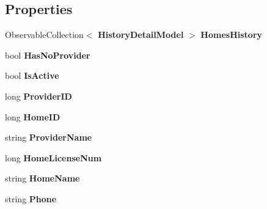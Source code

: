 \subsection*{Properties}
\begin{DoxyCompactItemize}
\item 
\mbox{\label{class_a_f_h___scheduler_1_1_data_1_1_schedule_model_a9bd568e7c4086ee32418044a2c4a8385}} 
Observable\+Collection$<$ \textbf{ History\+Detail\+Model} $>$ {\bfseries Homes\+History}\hspace{0.3cm}{\ttfamily  [get, set]}
\item 
\mbox{\label{class_a_f_h___scheduler_1_1_data_1_1_schedule_model_a4b3d6c839efadc3fd06da76a81ac7876}} 
bool {\bfseries Has\+No\+Provider}\hspace{0.3cm}{\ttfamily  [get, set]}
\item 
\mbox{\label{class_a_f_h___scheduler_1_1_data_1_1_schedule_model_a5cf253dcdd9f5f0602ce84fcbc501b51}} 
bool {\bfseries Is\+Active}\hspace{0.3cm}{\ttfamily  [get, set]}
\item 
\mbox{\label{class_a_f_h___scheduler_1_1_data_1_1_schedule_model_a94c43f5c147fc48895635e306544a483}} 
long {\bfseries Provider\+ID}\hspace{0.3cm}{\ttfamily  [get, set]}
\item 
\mbox{\label{class_a_f_h___scheduler_1_1_data_1_1_schedule_model_a65429a4a0deb73104c00799f2741d01d}} 
long {\bfseries Home\+ID}\hspace{0.3cm}{\ttfamily  [get, set]}
\item 
\mbox{\label{class_a_f_h___scheduler_1_1_data_1_1_schedule_model_a7e466257a5402e02db007e63ccb801cb}} 
string {\bfseries Provider\+Name}\hspace{0.3cm}{\ttfamily  [get, set]}
\item 
\mbox{\label{class_a_f_h___scheduler_1_1_data_1_1_schedule_model_ad6af4b8863e6c487d762306e7ed3749a}} 
long {\bfseries Home\+License\+Num}\hspace{0.3cm}{\ttfamily  [get, set]}
\item 
\mbox{\label{class_a_f_h___scheduler_1_1_data_1_1_schedule_model_aa7d2fee00278cb59e3bf4111ccc0a833}} 
string {\bfseries Home\+Name}\hspace{0.3cm}{\ttfamily  [get, set]}
\item 
\mbox{\label{class_a_f_h___scheduler_1_1_data_1_1_schedule_model_a3583033b1cb5d9f6e05fa92073f27b00}} 
string {\bfseries Phone}\hspace{0.3cm}{\ttfamily  [get, set]}

\end{DoxyCompactItemize}

